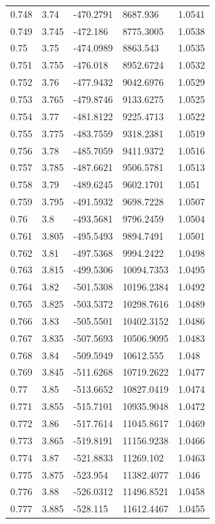 \begin{tabular}{lllll}
0.748 & 3.74 & -470.2791 & 8687.936 & 1.0541 \\
0.749 & 3.745 & -472.186 & 8775.3005 & 1.0538 \\
0.75 & 3.75 & -474.0989 & 8863.543 & 1.0535 \\
0.751 & 3.755 & -476.018 & 8952.6724 & 1.0532 \\
0.752 & 3.76 & -477.9432 & 9042.6976 & 1.0529 \\
0.753 & 3.765 & -479.8746 & 9133.6275 & 1.0525 \\
0.754 & 3.77 & -481.8122 & 9225.4713 & 1.0522 \\
0.755 & 3.775 & -483.7559 & 9318.2381 & 1.0519 \\
0.756 & 3.78 & -485.7059 & 9411.9372 & 1.0516 \\
0.757 & 3.785 & -487.6621 & 9506.5781 & 1.0513 \\
0.758 & 3.79 & -489.6245 & 9602.1701 & 1.051 \\
0.759 & 3.795 & -491.5932 & 9698.7228 & 1.0507 \\
0.76 & 3.8 & -493.5681 & 9796.2459 & 1.0504 \\
0.761 & 3.805 & -495.5493 & 9894.7491 & 1.0501 \\
0.762 & 3.81 & -497.5368 & 9994.2422 & 1.0498 \\
0.763 & 3.815 & -499.5306 & 10094.7353 & 1.0495 \\
0.764 & 3.82 & -501.5308 & 10196.2384 & 1.0492 \\
0.765 & 3.825 & -503.5372 & 10298.7616 & 1.0489 \\
0.766 & 3.83 & -505.5501 & 10402.3152 & 1.0486 \\
0.767 & 3.835 & -507.5693 & 10506.9095 & 1.0483 \\
0.768 & 3.84 & -509.5949 & 10612.555 & 1.048 \\
0.769 & 3.845 & -511.6268 & 10719.2622 & 1.0477 \\
0.77 & 3.85 & -513.6652 & 10827.0419 & 1.0474 \\
0.771 & 3.855 & -515.7101 & 10935.9048 & 1.0472 \\
0.772 & 3.86 & -517.7614 & 11045.8617 & 1.0469 \\
0.773 & 3.865 & -519.8191 & 11156.9238 & 1.0466 \\
0.774 & 3.87 & -521.8833 & 11269.102 & 1.0463 \\
0.775 & 3.875 & -523.954 & 11382.4077 & 1.046 \\
0.776 & 3.88 & -526.0312 & 11496.8521 & 1.0458 \\
0.777 & 3.885 & -528.115 & 11612.4467 & 1.0455 \\

\end{tabular}
